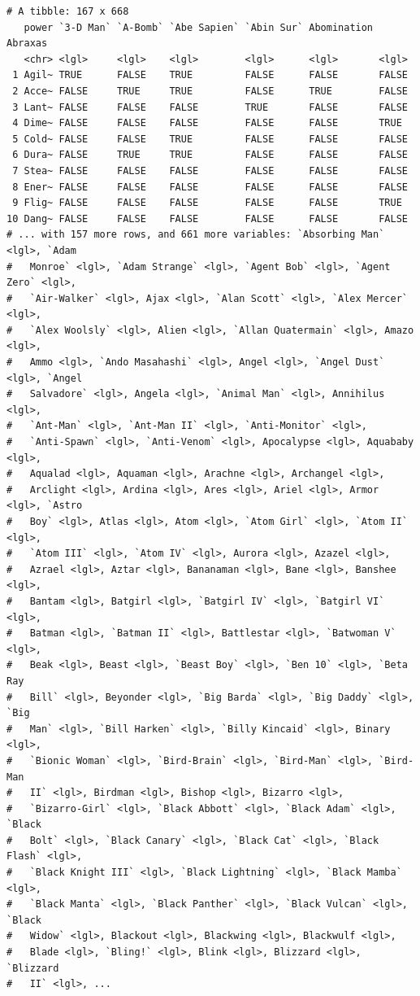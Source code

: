 \documentclass[
]{book}
\begin{document}
\begin{verbatim}
# A tibble: 167 x 668
   power `3-D Man` `A-Bomb` `Abe Sapien` `Abin Sur` Abomination Abraxas
   <chr> <lgl>     <lgl>    <lgl>        <lgl>      <lgl>       <lgl>  
 1 Agil~ TRUE      FALSE    TRUE         FALSE      FALSE       FALSE  
 2 Acce~ FALSE     TRUE     TRUE         FALSE      TRUE        FALSE  
 3 Lant~ FALSE     FALSE    FALSE        TRUE       FALSE       FALSE  
 4 Dime~ FALSE     FALSE    FALSE        FALSE      FALSE       TRUE   
 5 Cold~ FALSE     FALSE    TRUE         FALSE      FALSE       FALSE  
 6 Dura~ FALSE     TRUE     TRUE         FALSE      FALSE       FALSE  
 7 Stea~ FALSE     FALSE    FALSE        FALSE      FALSE       FALSE  
 8 Ener~ FALSE     FALSE    FALSE        FALSE      FALSE       FALSE  
 9 Flig~ FALSE     FALSE    FALSE        FALSE      FALSE       TRUE   
10 Dang~ FALSE     FALSE    FALSE        FALSE      FALSE       FALSE  
# ... with 157 more rows, and 661 more variables: `Absorbing Man` <lgl>, `Adam
#   Monroe` <lgl>, `Adam Strange` <lgl>, `Agent Bob` <lgl>, `Agent Zero` <lgl>,
#   `Air-Walker` <lgl>, Ajax <lgl>, `Alan Scott` <lgl>, `Alex Mercer` <lgl>,
#   `Alex Woolsly` <lgl>, Alien <lgl>, `Allan Quatermain` <lgl>, Amazo <lgl>,
#   Ammo <lgl>, `Ando Masahashi` <lgl>, Angel <lgl>, `Angel Dust` <lgl>, `Angel
#   Salvadore` <lgl>, Angela <lgl>, `Animal Man` <lgl>, Annihilus <lgl>,
#   `Ant-Man` <lgl>, `Ant-Man II` <lgl>, `Anti-Monitor` <lgl>,
#   `Anti-Spawn` <lgl>, `Anti-Venom` <lgl>, Apocalypse <lgl>, Aquababy <lgl>,
#   Aqualad <lgl>, Aquaman <lgl>, Arachne <lgl>, Archangel <lgl>,
#   Arclight <lgl>, Ardina <lgl>, Ares <lgl>, Ariel <lgl>, Armor <lgl>, `Astro
#   Boy` <lgl>, Atlas <lgl>, Atom <lgl>, `Atom Girl` <lgl>, `Atom II` <lgl>,
#   `Atom III` <lgl>, `Atom IV` <lgl>, Aurora <lgl>, Azazel <lgl>,
#   Azrael <lgl>, Aztar <lgl>, Bananaman <lgl>, Bane <lgl>, Banshee <lgl>,
#   Bantam <lgl>, Batgirl <lgl>, `Batgirl IV` <lgl>, `Batgirl VI` <lgl>,
#   Batman <lgl>, `Batman II` <lgl>, Battlestar <lgl>, `Batwoman V` <lgl>,
#   Beak <lgl>, Beast <lgl>, `Beast Boy` <lgl>, `Ben 10` <lgl>, `Beta Ray
#   Bill` <lgl>, Beyonder <lgl>, `Big Barda` <lgl>, `Big Daddy` <lgl>, `Big
#   Man` <lgl>, `Bill Harken` <lgl>, `Billy Kincaid` <lgl>, Binary <lgl>,
#   `Bionic Woman` <lgl>, `Bird-Brain` <lgl>, `Bird-Man` <lgl>, `Bird-Man
#   II` <lgl>, Birdman <lgl>, Bishop <lgl>, Bizarro <lgl>,
#   `Bizarro-Girl` <lgl>, `Black Abbott` <lgl>, `Black Adam` <lgl>, `Black
#   Bolt` <lgl>, `Black Canary` <lgl>, `Black Cat` <lgl>, `Black Flash` <lgl>,
#   `Black Knight III` <lgl>, `Black Lightning` <lgl>, `Black Mamba` <lgl>,
#   `Black Manta` <lgl>, `Black Panther` <lgl>, `Black Vulcan` <lgl>, `Black
#   Widow` <lgl>, Blackout <lgl>, Blackwing <lgl>, Blackwulf <lgl>,
#   Blade <lgl>, `Bling!` <lgl>, Blink <lgl>, Blizzard <lgl>, `Blizzard
#   II` <lgl>, ...
\end{verbatim}
\end{document}
